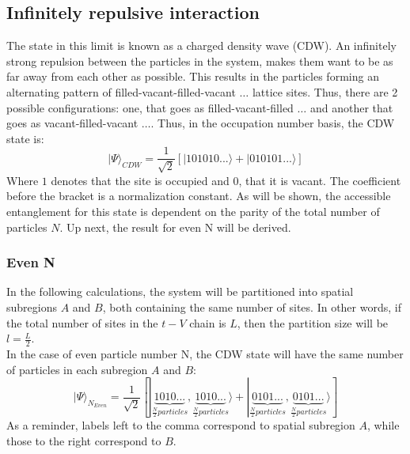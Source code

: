	\subsection{Infinitely repulsive interaction}
		The state in this limit is known as a charged density wave (CDW). An infinitely strong repulsion between the particles in the system, makes them want to be as far away from each other as possible. This results in the particles forming an alternating pattern of filled-vacant-filled-vacant $\dots$ lattice sites. Thus, there are 2 possible configurations: one, that goes as filled-vacant-filled $\dots$ and another that goes as vacant-filled-vacant $\dots$. Thus, in the occupation number basis, the CDW state is:
%
\begin{equation}
| \Psi \rangle_{CDW} = \frac{1}{\sqrt{2}} [|101010... \rangle + |010101... \rangle ] 
\end{equation}
%
Where $1$ denotes that the site is occupied and $0$, that it is vacant. The coefficient before the bracket is a normalization constant. As will be shown, the accessible entanglement for this state is dependent on the parity of the total number of particles $N$. Up next, the result for even N will be derived.

	\subsubsection{Even N}
	In the following calculations, the system will be partitioned into spatial subregions $A$ and $B$, both containing the same number of sites. In other words, if the total number of sites in the $t-V$ chain is $L$, then the partition size will be $l=\frac{L}{2}$. \\
	
In the case of even particle number N, the CDW state will have the same number of particles in each subregion $A$ and $B$:
%
\begin{equation}
| \Psi \rangle_{N_{Even}} = \frac{1}{\sqrt{2}} [|\underbrace{1010...}_{\frac{N}{2} particles}, \underbrace{1010...}_{\frac{N}{2} particles} \rangle + |\underbrace{0101...}_{\frac{N}{2} particles}, \underbrace{0101...}_{\frac{N}{2} particles} \rangle ] 
\end{equation}
%
As a reminder, labels left to the comma correspond to spatial subregion $A$, while those to the right correspond to $B$.

